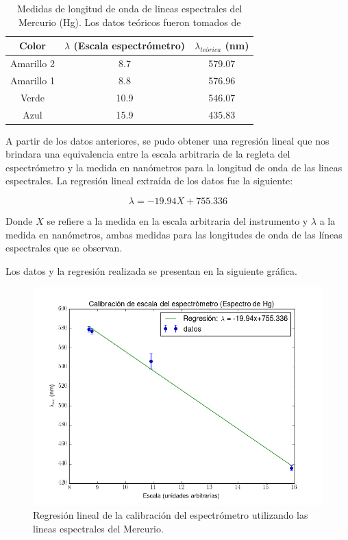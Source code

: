 \documentclass[%
 reprint,
 amsmath,amssymb,
 aps,
]{revtex4-1}
\begin{document}
\begin{table}[H]
    \centering
    \begin{tabular}{|c|c|c|}
    \hline
    Color & $\lambda$ (Escala espectrómetro) & $\lambda_{teórica}$ (nm) \\ \hline
    Amarillo 2 & 8.7 & 579.07 \\ \hline
    Amarillo 1 & 8.8 & 576.96 \\ \hline
    Verde & 10.9 & 546.07 \\ \hline
    Azul & 15.9 & 435.83 \\ \hline
    \end{tabular}
    \caption{Medidas de longitud de onda de lineas espectrales del Mercurio (Hg). Los datos teóricos fueron tomados de \cite{nist}}
    \label{tab:calibracion}
\end{table}

A partir de los datos anteriores, se pudo obtener una regresión lineal que nos brindara una equivalencia entre la escala arbitraria de la regleta del espectrómetro y la medida en nanómetros para la longitud de onda de las lineas espectrales. La regresión lineal extraída de los datos fue la siguiente:

\begin{equation}
 \lambda = -19.94 X + 755.336
\end{equation}

Donde $X$ se refiere a la medida en la escala arbitraria del instrumento y $\lambda$ a la medida en nanómetros, ambas medidas para las longitudes de onda de las líneas espectrales que se observan.

Los datos y la regresión realizada se presentan en la siguiente gráfica.

\begin{figure}[H]
    \centering
    \includegraphics[scale=0.4]{calibracion.png}
    \caption{Regresión lineal de la calibración del espectrómetro utilizando las lineas espectrales del Mercurio.}
    \label{fig:calibracion}
\end{figure}
\end{document}
